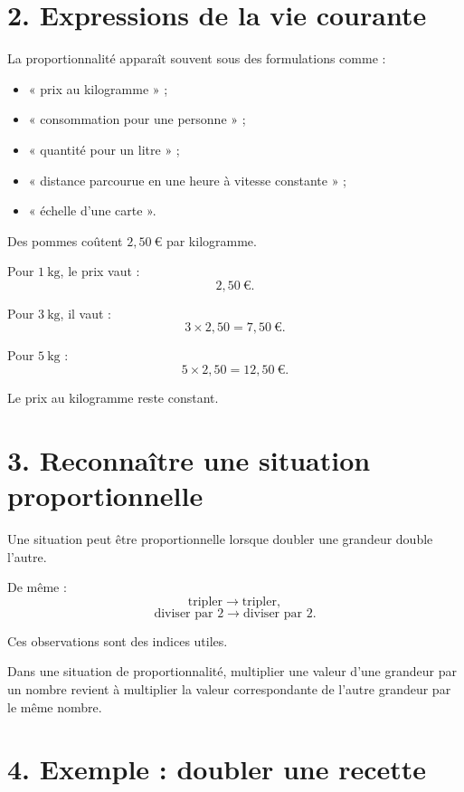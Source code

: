 \section{2. Expressions de la vie courante}

La proportionnalité apparaît souvent sous des formulations comme :
\begin{itemize}
\item « prix au kilogramme » ;
\item « consommation pour une personne » ;
\item « quantité pour un litre » ;
\item « distance parcourue en une heure à vitesse constante » ;
\item « échelle d'une carte ».
\end{itemize}

\begin{exemple}
Des pommes coûtent $2{,}50\ \text{€}$ par kilogramme.

Pour $1\ \text{kg}$, le prix vaut :
\[
2{,}50\ \text{€}.
\]

Pour $3\ \text{kg}$, il vaut :
\[
3\times2{,}50=7{,}50\ \text{€}.
\]

Pour $5\ \text{kg}$ :
\[
5\times2{,}50=12{,}50\ \text{€}.
\]
\end{exemple}

Le prix au kilogramme reste constant.

\section{3. Reconnaître une situation proportionnelle}

Une situation peut être proportionnelle lorsque doubler une grandeur double l'autre.

De même :
\[
\text{tripler}\longrightarrow\text{tripler},
\]
\[
\text{diviser par }2\longrightarrow\text{diviser par }2.
\]

Ces observations sont des indices utiles.

\begin{propriete}
Dans une situation de proportionnalité, multiplier une valeur d'une grandeur par un nombre revient à multiplier la valeur correspondante de l'autre grandeur par le même nombre.
\end{propriete}

\section{4. Exemple : doubler une recette}


